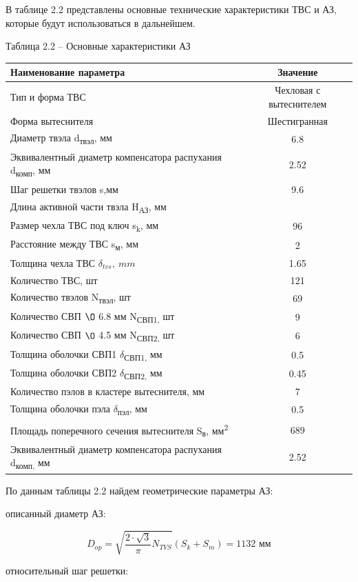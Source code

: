 В таблице 2.2 представлены основные технические характеристики ТВС и АЗ,
которые будут использоваться в дальнейшем.

Таблица 2.2 -- Основные характеристики АЗ

\begin{longtable}[]{@{}|p{10cm}|c|@{}} 
\toprule
Наименование параметра & Значение\tabularnewline
\midrule
\endhead
Тип и форма ТВС & Чехловая с вытеснителем \tabularnewline
Форма вытеснителя & Шестигранная\tabularnewline
Диаметр твэла d\textsubscript{твэл}, мм & 6.8\tabularnewline
Эквивалентный диаметр компенсатора распухания d\textsubscript{комп}, мм
& 2.52\tabularnewline
Шаг решетки твэлов s,мм & 9.6\tabularnewline
Длина активной части твэла H\textsubscript{АЗ}, мм & \centering 1300\tabularnewline
Размер чехла ТВС под ключ s\textsubscript{k}, мм & 96\tabularnewline
Расстояние между ТВС s\textsubscript{м}, мм & 2\tabularnewline
Толщина чехла ТВС $\delta_{tvs},\ mm$ & 1.65\tabularnewline
Количество ТВС, шт & 121\tabularnewline
Количество твэлов N\textsubscript{твэл}, шт & 69\tabularnewline
Количество СВП $\O$ 6.8 мм N\textsubscript{СВП1,} шт & 9\tabularnewline
Количество СВП $\O$ 4.5 мм N\textsubscript{СВП2,} шт & 6\tabularnewline
Толщина оболочки СВП1 $\delta$\textsubscript{СВП1,} мм & 0.5\tabularnewline
Толщина оболочки СВП2 $\delta$\textsubscript{СВП2,} мм & 0.45\tabularnewline
Количество пэлов в кластере вытеснителя, мм & 7\tabularnewline
Толщина оболочки пэла $\delta$\textsubscript{пэл}, мм & 0.5\tabularnewline
Площадь поперечного сечения вытеснителя S\textsubscript{в},
мм\textsuperscript{2} & 689\tabularnewline
Эквивалентный диаметр компенсатора распухания d\textsubscript{комп,} мм
& 2.52\tabularnewline
\bottomrule
\end{longtable}

По данным таблицы 2.2 найдем геометрические параметры АЗ:

описанный диаметр АЗ:

\[D_{op} = \sqrt{\frac{2 \cdot \sqrt{3}}{\pi}N_{TVS}}(S_{k} + S_{m}) = 1132\textrm{ мм}\]

относительный шаг решетки:

